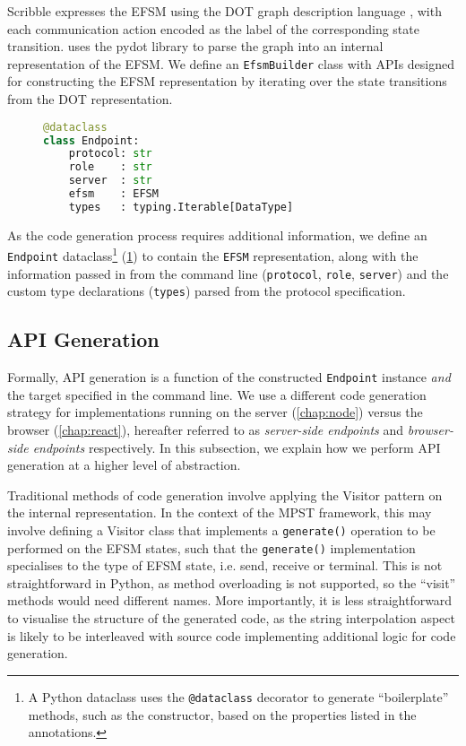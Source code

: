 Scribble expresses the EFSM using the 
DOT graph description language \cite{dot}, with each
communication action encoded as the label of the corresponding
state transition. 
 uses the pydot library \cite{pydot}
to parse the graph into an internal representation of the EFSM.
We define an \texttt{EfsmBuilder} class with APIs designed for
constructing the EFSM representation by iterating over the 
state transitions from the DOT representation.

\begin{figure}[!ht]
\begin{lstlisting}[language=Python]
@dataclass
class Endpoint:
    protocol: str
    role    : str
    server  : str
    efsm    : EFSM
    types   : typing.Iterable[DataType]
\end{lstlisting}
\label{lst:endpointapi}
\end{figure}

As the code generation process requires additional information,
we define an \texttt{Endpoint} dataclass\footnote{
A Python dataclass uses the \texttt{@dataclass} decorator to generate
``boilerplate'' methods, such as the constructor, based on the
properties listed in the annotations.} (\cref{lst:endpointapi})
to contain the \texttt{EFSM}
representation, along with the information passed in from the
command line (\texttt{protocol}, \texttt{role}, \texttt{server}) 
and the custom type declarations (\texttt{types}) parsed from the
protocol specification.

\subsection{API Generation}
\label{subsection:apigen}

Formally, API generation is a function of the constructed
\texttt{Endpoint} instance
\textit{and} the target specified in the command line. We use a 
different code generation strategy for implementations running on
the server (\cref{chap:node}) versus the browser (\cref{chap:react}),
hereafter referred to as \textit{server-side endpoints} and 
\textit{browser-side endpoints} respectively.
In this subsection, we explain how we perform API generation
at a higher level of abstraction.

Traditional methods of code generation involve applying the
Visitor pattern on the internal representation. 
In the context of the MPST framework,
this may involve defining a Visitor class that implements a
\texttt{generate()} operation to be performed on the EFSM states,
such that the \texttt{generate()} implementation specialises to the
type of EFSM state, i.e. send, receive or terminal.
This is not straightforward in Python, as method overloading is not 
supported, so the ``visit'' methods would need different names.
More importantly, it is less straightforward to visualise
the structure of the generated code, as the string interpolation
aspect is likely to be interleaved with source code implementing
additional logic for code generation.

